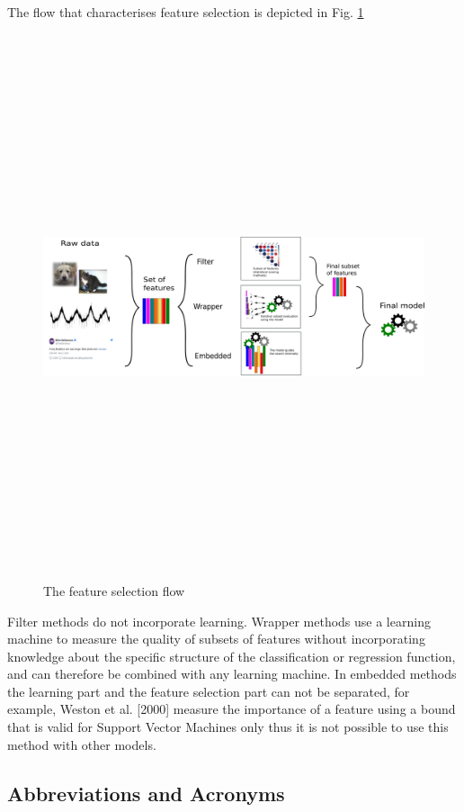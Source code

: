 \documentclass[journal,twoside,web]{ieeecolor}
\begin{document}
The flow that characterises feature selection is depicted in Fig. \ref{fig:flow}


\begin{figure} \label{fig:flow}
\centerline{\includegraphics[width=16cm,height=16cm,keepaspectratio]{./creando_figs/drawing-ii.pdf}}
\caption{The feature selection flow}
\end{figure}

Filter methods do not incorporate learning. Wrapper methods use a learning machine to measure the quality of subsets of features without incorporating knowledge about the specific structure of the classification or regression function, and can therefore be combined with any learning machine. In embedded methods the learning part and the feature selection part can not be separated, for example, Weston et al. [2000] measure the importance of a feature using a bound that is valid for Support Vector Machines only thus it is not possible to use this method with other models.



\subsection{Abbreviations and Acronyms}
\end{document}
